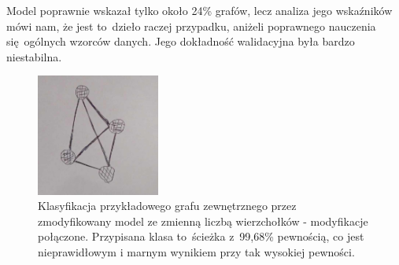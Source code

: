Model poprawnie wskazał tylko około 24\% grafów, lecz analiza jego wskaźników mówi nam,
że jest to~dzieło raczej przypadku, aniżeli poprawnego nauczenia się~ogólnych wzorców danych.
Jego dokładność walidacyjna była bardzo niestabilna.

\begin{figure}[ht]
	\centering
	\includegraphics[height=4cm]{../graph_classification/test_graphs/drawn/full-3.png}
	\caption{Klasyfikacja przykładowego grafu zewnętrznego przez zmodyfikowany model ze zmienną liczbą wierzchołków - modyfikacje połączone.
		Przypisana klasa to~ścieżka z~99,68\% pewnością, co jest nieprawidłowym i marnym wynikiem przy tak wysokiej pewności.}
	\label{Fig:tests-cv-2d}
\end{figure}
\FloatBarrier